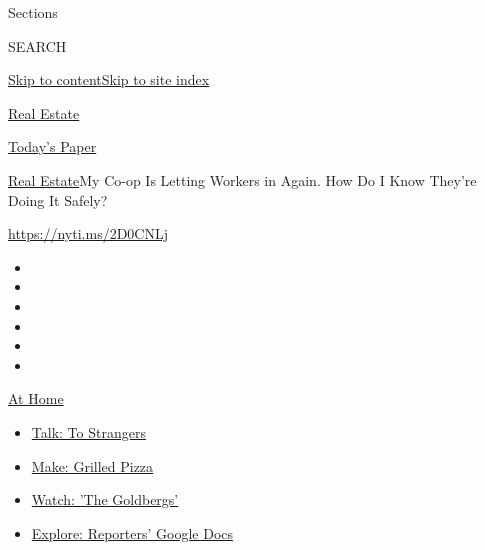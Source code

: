 Sections

SEARCH

\protect\hyperlink{site-content}{Skip to
content}\protect\hyperlink{site-index}{Skip to site index}

\href{https://www.nytimes.com/section/realestate}{Real Estate}

\href{https://myaccount.nytimes.com/auth/login?response_type=cookie\&client_id=vi}{}

\href{https://www.nytimes.com/section/todayspaper}{Today's Paper}

\href{/section/realestate}{Real Estate}\textbar{}My Co-op Is Letting
Workers in Again. How Do I Know They're Doing It Safely?

\url{https://nyti.ms/2D0CNLj}

\begin{itemize}
\item
\item
\item
\item
\item
\item
\end{itemize}

\href{https://www.nytimes.com/spotlight/at-home?action=click\&pgtype=Article\&state=default\&region=TOP_BANNER\&context=at_home_menu}{At
Home}

\begin{itemize}
\tightlist
\item
  \href{https://www.nytimes.com/2020/08/03/well/family/the-benefits-of-talking-to-strangers.html?action=click\&pgtype=Article\&state=default\&region=TOP_BANNER\&context=at_home_menu}{Talk:
  To Strangers}
\item
  \href{https://www.nytimes.com/2020/08/01/at-home/coronavirus-make-pizza-on-a-grill.html?action=click\&pgtype=Article\&state=default\&region=TOP_BANNER\&context=at_home_menu}{Make:
  Grilled Pizza}
\item
  \href{https://www.nytimes.com/2020/07/31/arts/television/goldbergs-abc-stream.html?action=click\&pgtype=Article\&state=default\&region=TOP_BANNER\&context=at_home_menu}{Watch:
  'The Goldbergs'}
\item
  \href{https://www.nytimes.com/interactive/2020/at-home/even-more-reporters-editors-diaries-lists-recommendations.html?action=click\&pgtype=Article\&state=default\&region=TOP_BANNER\&context=at_home_menu}{Explore:
  Reporters' Google Docs}
\end{itemize}

